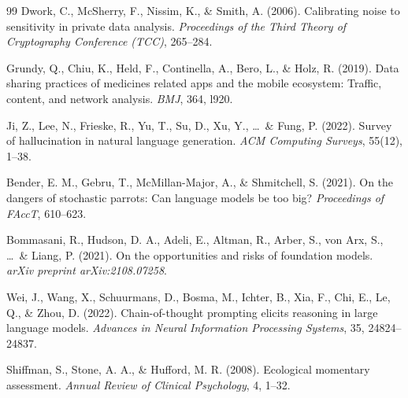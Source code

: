 \documentclass[12pt,twoside]{article}
\begin{document}
\begin{thebibliography}{99}
Dwork, C., McSherry, F., Nissim, K., \& Smith, A. (2006). Calibrating noise to sensitivity in private data analysis. \textit{Proceedings of the Third Theory of Cryptography Conference (TCC)}, 265--284.

Grundy, Q., Chiu, K., Held, F., Continella, A., Bero, L., \& Holz, R. (2019). Data sharing practices of medicines related apps and the mobile ecosystem: Traffic, content, and network analysis. \textit{BMJ}, 364, l920.


Ji, Z., Lee, N., Frieske, R., Yu, T., Su, D., Xu, Y., \ldots\ \& Fung, P. (2022). Survey of hallucination in natural language generation. \textit{ACM Computing Surveys}, 55(12), 1--38.

Bender, E. M., Gebru, T., McMillan-Major, A., \& Shmitchell, S. (2021). On the dangers of stochastic parrots: Can language models be too big? \textit{Proceedings of FAccT}, 610--623.

Bommasani, R., Hudson, D. A., Adeli, E., Altman, R., Arber, S., von Arx, S., \ldots\ \& Liang, P. (2021). On the opportunities and risks of foundation models. \textit{arXiv preprint arXiv:2108.07258}.

Wei, J., Wang, X., Schuurmans, D., Bosma, M., Ichter, B., Xia, F., Chi, E., Le, Q., \& Zhou, D. (2022). Chain-of-thought prompting elicits reasoning in large language models. \textit{Advances in Neural Information Processing Systems}, 35, 24824--24837.


Shiffman, S., Stone, A. A., \& Hufford, M. R. (2008). Ecological momentary assessment. \textit{Annual Review of Clinical Psychology}, 4, 1--32.

\end{thebibliography}
\end{document}
